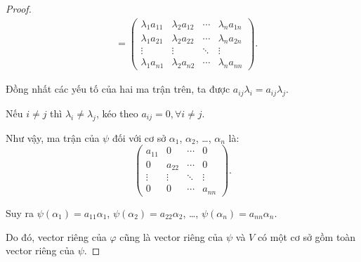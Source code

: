 \documentclass[class=linearalgebra,crop=false]{standalone}
\begin{document}
\begin{proof}
\begin{align*}
         & =
        \begin{pmatrix}
            \lambda_{1}a_{11} & \lambda_{2}a_{12} & \cdots & \lambda_{n}a_{1n} \\
            \lambda_{1}a_{21} & \lambda_{2}a_{22} & \cdots & \lambda_{n}a_{2n} \\
            \vdots            & \vdots            & \ddots & \vdots            \\
            \lambda_{1}a_{n1} & \lambda_{2}a_{n2} & \cdots & \lambda_{n}a_{nn}
        \end{pmatrix}.
    \end{align*}
    \endgroup
    \par Đồng nhất các yếu tố của hai ma trận trên, ta được $a_{ij}\lambda_{i} = a_{ij}\lambda_{j}$.
    \par Nếu $i\ne j$ thì $\lambda_{i}\ne\lambda_{j}$, kéo theo $a_{ij} = 0, \forall i\ne j$.
    \par Như vậy, ma trận của $\psi$ đối với cơ sở $\alpha_{1}$, $\alpha_{2}$, \ldots, $\alpha_{n}$ là:
    \[
        \begin{pmatrix}
            a_{11} & 0      & \cdots & 0      \\
            0      & a_{22} & \cdots & 0      \\
            \vdots & \vdots & \ddots & \vdots \\
            0      & 0      & \cdots & a_{nn}
        \end{pmatrix}.
    \]
    \par Suy ra $\psi(\alpha_{1}) = a_{11}\alpha_{1}$, $\psi(\alpha_{2}) = a_{22}\alpha_{2}$, \ldots, $\psi(\alpha_{n}) = a_{nn}\alpha_{n}$.
    \par Do đó, vector riêng của $\varphi$ cũng là vector riêng của $\psi$ và $V$ có một cơ sở gồm toàn vector riêng của $\psi$.
\end{proof}
\end{document}
